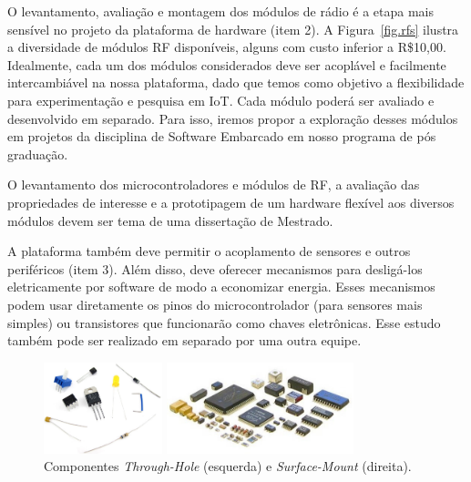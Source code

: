 \documentclass[titlepage,12pt]{article}
\begin{document}
O levantamento, avaliação e montagem dos módulos de rádio é a etapa mais
sensível no projeto da plataforma de hardware (item 2).
%
A Figura~\ref{fig.rfs} ilustra a diversidade de módulos RF disponíveis, alguns
com custo inferior a R\$10,00.
%
Idealmente, cada um dos módulos considerados deve ser acoplável e facilmente
intercambiável na nossa plataforma, dado que temos como objetivo a
flexibilidade para experimentação e pesquisa em IoT.
%
Cada módulo poderá ser avaliado e desenvolvido em separado.
Para isso, iremos propor a exploração desses módulos em projetos da disciplina
de Software Embarcado em nosso programa de pós graduação.

O levantamento dos microcontroladores e módulos de RF, a avaliação das
propriedades de interesse e a prototipagem de um hardware flexível aos diversos
módulos devem ser tema de uma dissertação de Mestrado.

A plataforma também deve permitir o acoplamento de sensores e outros
periféricos (item 3).
%
Além disso, deve oferecer mecanismos para desligá-los eletricamente por
software de modo a economizar energia.
%
Esses mecanismos podem usar diretamente os pinos do microcontrolador (para
sensores mais simples) ou transistores que funcionarão como chaves eletrônicas.
%
Esse estudo também pode ser realizado em separado por uma outra equipe.

\begin{figure}
\begin{minipage}{0.50\textwidth}
\includegraphics[height=100px]{through-hole}
\end{minipage}
\begin{minipage}{0.50\textwidth}
\includegraphics[height=100px]{smd}
\end{minipage}
\caption{ Componentes \emph{Through-Hole} (esquerda) e \emph{Surface-Mount} (direita).
    \label{fig.mount}
}
\end{figure}
\end{document}
